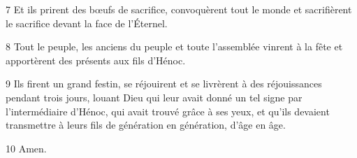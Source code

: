 \par 7 Et ils prirent des bœufs de sacrifice, convoquèrent tout le monde et sacrifièrent le sacrifice devant la face de l'Éternel.

\par 8 Tout le peuple, les anciens du peuple et toute l'assemblée vinrent à la fête et apportèrent des présents aux fils d'Hénoc.

\par 9 Ils firent un grand festin, se réjouirent et se livrèrent à des réjouissances pendant trois jours, louant Dieu qui leur avait donné un tel signe par l'intermédiaire d'Hénoc, qui avait trouvé grâce à ses yeux, et qu'ils devaient transmettre à leurs fils de génération en génération, d'âge en âge.

\par 10 Amen.



